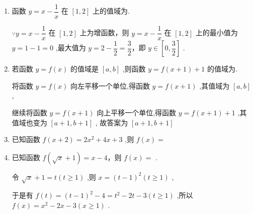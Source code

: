 \begin{enumerate}
\begin{jieda}
        所以 $f\left( x\right)  = \dfrac{1}{{x}^{2} - x + 2}$ 的定义域是 $\mathbf{R}$ ,值域为 $\left( {0,\dfrac{4}{7}}\right\rbrack$ .
    \end{jieda}
    \item 函数 $y = x - \dfrac{1}{x}$ 在 $\left\lbrack  {1,2}\right\rbrack$ 上的值域为.
    \begin{jieda}
        $\because y = x - \dfrac{1}{x}$ 在 $\left\lbrack  {1,2}\right\rbrack$ 上为增函数，则 $y = x - \dfrac{1}{x}$ 在 $\left\lbrack  {1,2}\right\rbrack$ 上的最小值为 $y = 1 - 1 = 0$ ,最大值为 $y = 2 - \dfrac{1}{2} = \dfrac{3}{2}$，即 $y \in  \left\lbrack  {0,\dfrac{3}{2}}\right\rbrack$ .
    \end{jieda}
    \item 若函数 $y = f\left( x\right)$ 的值域是 $\left\lbrack  {a,b}\right\rbrack$ ,则函数 $y = f\left( {x + 1}\right)  + 1$ 的值域为.
    \begin{jieda}
        将函数 $y = f\left( x\right)$ 向左平移一个单位,得函数 $y = f\left( {x + 1}\right)$ ,其值域为 $\left\lbrack  {a,b}\right\rbrack$ ,
        
        继续将函数 $y = f\left( {x + 1}\right)$ 向上平移一个单位,得函数 $y = f\left( {x + 1}\right)  + 1$ ,其值域也变为 $\left\lbrack  {a + 1,b + 1}\right\rbrack$ , 故答案为 $\left\lbrack  {a + 1,b + 1}\right\rbrack$
    \end{jieda}
    \item 已知函数 $f\left( {x + 2}\right)  = 2{x}^{2} + {4x} + 3$ ,则 $f\left( x\right)  =$ 
    \item 已知函数 $f\left( {\sqrt{x} + 1}\right)  = x - 4$，则 $f\left( x\right)  =$ .
    \begin{jieda}
        令 $\sqrt{x} + 1 = t\left( {t \geq  1}\right)$ ,则 $x = {\left( t - 1\right) }^{2}\left( {t \geq  1}\right)$ ,
        
        于是有 $f\left( t\right)  = {\left( t - 1\right) }^{2} - 4 = {t}^{2} - {2t} - 3\left( {t \geq  1}\right)$ ,所以 $f\left( x\right)  = {x}^{2} - {2x} - 3\left( {x \geq  1}\right)$ .
    \end{jieda}
    \end{enumerate}
